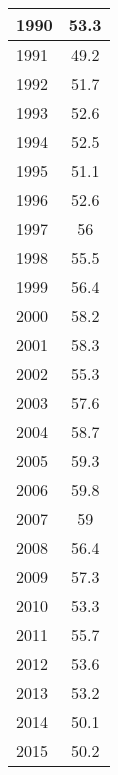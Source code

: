 \documentclass{mcmthesis}
\begin{document}
\begin{appendices}
\begin{minipage}{\textwidth}
\begin{minipage}[t]{0.45\textwidth}
\begin{tabular}{|l|c|}
            1990 & 53.3                       \\ \hline
            1991 & 49.2                       \\ \hline
            1992 & 51.7                       \\ \hline
            1993 & 52.6                       \\ \hline
            1994 & 52.5                       \\ \hline
            1995 & 51.1                       \\ \hline
            1996 & 52.6                       \\ \hline
            1997 & 56                         \\ \hline
            1998 & 55.5                       \\ \hline
            1999 & 56.4                       \\ \hline
            2000 & 58.2                       \\ \hline
            2001 & 58.3                       \\ \hline
            2002 & 55.3                       \\ \hline
            2003 & 57.6                       \\ \hline
            2004 & 58.7                       \\ \hline
            2005 & 59.3                       \\ \hline
            2006 & 59.8                       \\ \hline
            2007 & 59                         \\ \hline
            2008 & 56.4                       \\ \hline
            2009 & 57.3                       \\ \hline
            2010 & 53.3                       \\ \hline
            2011 & 55.7                       \\ \hline
            2012 & 53.6                       \\ \hline
            2013 & 53.2                       \\ \hline
            2014 & 50.1                       \\ \hline
            2015 & 50.2                       \\ \hline
            \end{tabular}
  \end{minipage}
\end{minipage}


\end{appendices}
\end{document}
